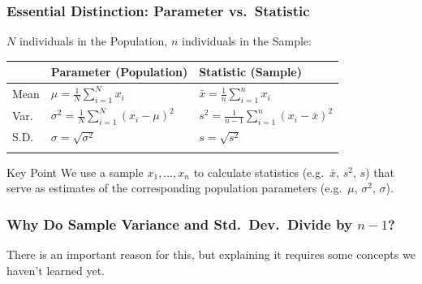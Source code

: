\documentclass[handout]{beamer}
\begin{document}
\begin{frame}

\frametitle{Essential Distinction: Parameter vs.\ Statistic}
$N$ individuals in the Population, $n$ individuals in the Sample:

\vspace{1em}
\small
\begin{tabular}{l|l|l}
	&\textbf{Parameter} (Population)&\textbf{Statistic} (Sample)\\
	\hline
	Mean&$\displaystyle\mu = \frac{1}{N} \sum_{i=1}^N x_i$& $\displaystyle\bar{x} = \frac{1}{n} \sum_{i=1}^n x_i$ \\
	Var.\ &$\displaystyle \sigma^2 = \frac{1}{N}\sum_{i=1}^N (x_i - \mu)^2$ &$\displaystyle s^2 = \frac{1}{n-1}\sum_{i=1}^n(x_i - \bar{x})^2$\\
	S.D.\ &$\sigma = \sqrt{\sigma^2}$ &$s = \sqrt{s^2}$ \\
	&&
\end{tabular}

\vspace{2em}
\begin{alertblock}{Key Point}
We  use a \alert{sample} $x_1, \hdots, x_n$ to calculate \alert{statistics} (e.g.\ $\bar{x}$, $s^2$, $s$) that serve as \alert{estimates} of the corresponding population \alert{parameters} (e.g.\ $\mu$, $\sigma^2$, $\sigma$).
\end{alertblock}
\end{frame}
\begin{frame}
\frametitle{Why Do Sample Variance and Std.\ Dev.\ Divide by $n-1$? }
\footnotesize
{}
\normalsize

\vspace{3em}
\alert{There is an important reason for this, but explaining it requires some concepts we haven't learned yet. }

\end{frame}
\end{document}
